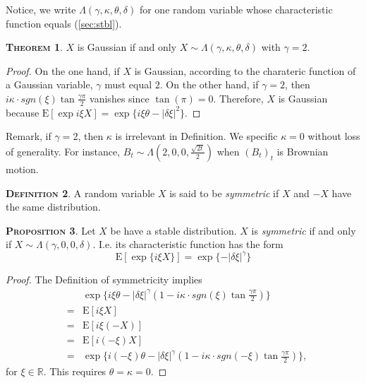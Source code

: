 \documentclass[a4paper, twoside, 11pt]{article}
\theoremstyle{definition}
\newtheorem{definition}{\scshape Definition}[section]
\newtheorem{theorem}[definition]{\scshape Theorem}
\newtheorem{proposition}[definition]{\scshape Proposition}
\begin{document}
Notice, we write $\Lambda(\gamma, \kappa, \theta, \delta)$ for one random variable whose characteristic function equals (\ref{sec:stbl}).

\begin{theorem}
  $X$ is Gaussian if and only $X \sim \Lambda(\gamma, \kappa, \theta, \delta)$ with $\gamma = 2$.
\end{theorem}
\begin{proof}
  On the one hand, if $X$ is Gaussian, according to the charateric function of a Gaussian variable, $\gamma$ must equal $2$. On the other hand, if $\gamma = 2$, then $i\kappa\cdot sgn(\xi)\tan \frac{\gamma\pi}{2}$ vanishes since $\tan(\pi) = 0$. Therefore, $X$ is Gaussian because $\mathrm{E} [\exp i\xi X]=\exp\{i \xi \theta - |\delta\xi|^2\}$.
\end{proof}
Remark, if $\gamma=2$, then $\kappa$ is irrelevant in Definition. We specific $\kappa = 0$ without loss of generality. For instance, $B_t \sim \Lambda(2, 0, 0, \frac{\sqrt{2t}}{2})$ when $(B_t)_t$ is Brownian motion.

\begin{definition}
  A random variable $X$ is said to be \emph{symmetric} if $X$ and $-X$ have the same distribution.
\end{definition}

\begin{proposition}
  Let $X$ be have a stable distribution. $X$ is  \emph{symmetric} if and only if $X \sim \Lambda(\gamma, 0, 0, \delta)$. I.e. its characteristic function has the form
  \begin{equation}
	\mathrm{E}[\exp\{i \xi X\}] = \exp\{-|\delta\xi|^\gamma\}
  \end{equation}
\end{proposition}
\begin{proof}
  The Definition of symmetricity implies
  \begin{eqnarray*}
	&&\exp\{i \xi \theta - |\delta\xi|^\gamma(1-i\kappa\cdot sgn(\xi)\tan \frac{\gamma\pi}{2})\}\\
	&=& \mathrm{E}[i\xi X]\\
	&=& \mathrm{E}[i\xi (-X)]\\
	&=& \mathrm{E}[i (-\xi) X]\\
	&=& \exp\{i (-\xi) \theta - |\delta\xi|^\gamma(1-i\kappa\cdot sgn(-\xi)\tan \frac{\gamma\pi}{2})\},
  \end{eqnarray*}
  for $\xi \in \mathbb{R}$. This requires $\theta=\kappa=0$.
\end{proof}
\end{document}

